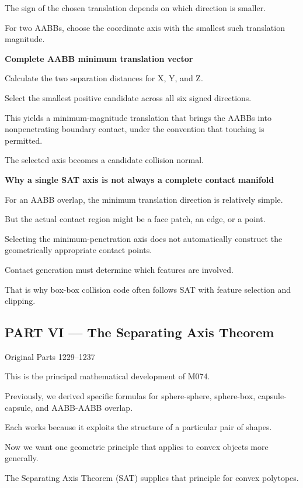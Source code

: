 The sign of the chosen translation depends on which direction is smaller.

For two AABBs, choose the coordinate axis with the smallest such translation magnitude.

\textbf{Complete AABB minimum translation vector}

Calculate the two separation distances for X, Y, and Z.

Select the smallest positive candidate across all six signed directions.

This yields a minimum-magnitude translation that brings the AABBs into nonpenetrating boundary contact, under the convention that touching is permitted.

The selected axis becomes a candidate collision normal.

\textbf{Why a single SAT axis is not always a complete contact manifold}

For an AABB overlap, the minimum translation direction is relatively simple.

But the actual contact region might be a face patch, an edge, or a point.

Selecting the minimum-penetration axis does not automatically construct the geometrically appropriate contact points.

Contact generation must determine which features are involved.

That is why box-box collision code often follows SAT with feature selection and clipping.

\subsection{PART VI --- The Separating Axis Theorem}\label{04-visual-computing-ii-ch024-part-vi-the-separating-axis-theorem}

\hypertarget{04-visual-computing-ii-ch024-part-vi-the-separating-axis-theorem}{}

Original Parts 1229--1237

This is the principal mathematical development of M074.

Previously, we derived specific formulas for sphere-sphere, sphere-box, capsule-capsule, and AABB-AABB overlap.

Each works because it exploits the structure of a particular pair of shapes.

Now we want one geometric principle that applies to convex objects more generally.

The Separating Axis Theorem (SAT) supplies that principle for convex polytopes.

